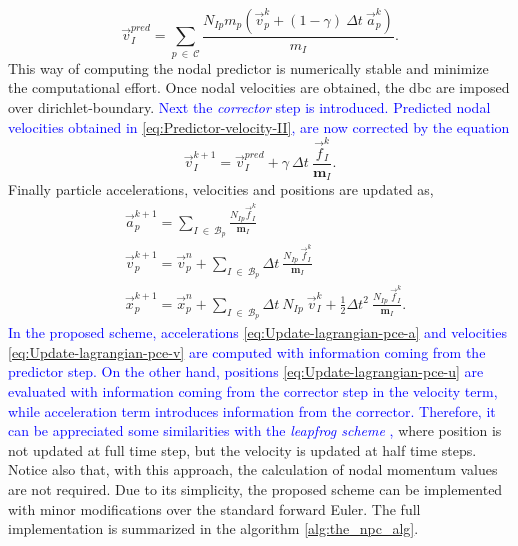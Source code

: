\documentclass[preprint,12pt,a4paper]{elsarticle}
\newcommand{\tens}[1]{
  \ensuremath{\mathbf{{#1}}}
}
\begin{document}
{\color{red}
\begin{equation}
  \label{eq:Predictor-velocity-II}
  \vec{v}_{I}^{pred} =  \sum_{p\ \in\ \mathcal{C}} \frac{ N_{Ip} m_p (\vec{v}_p^k + (1 - \gamma)\ \Delta t\ \vec{a}_p^k)}{m_I}.
\end{equation}
}
This way of computing the nodal predictor is numerically stable
and minimize the computational effort. Once nodal velocities are
obtained, the \acrshort{dbc} are imposed over \gls{dirichlet-boundary}. \textcolor{blue}{Next the \textit{corrector}  step is introduced. Predicted nodal velocities obtained in \eqref{eq:Predictor-velocity-II}, are now corrected by the equation}
\begin{equation}
  \label{eq:Corrector-velocity}
  \vec{v}_{I}^{k+1} = \vec{v}_{I}^{pred} + \gamma\ \Delta t\ \frac{\vec{f}_{I}^{k}}{\tens{m}_I}.
\end{equation}
Finally particle accelerations, velocities and positions are updated as,
\begin{align}
      \label{eq:Update-lagrangian-pce-a}    
        &\vec{a}_p^{k+1} = \sum_{I\ \in\ \mathcal{B}_p} \frac{N_{Ip}\vec{f}_{I}^{k}}{\tens{m}_I}\\
        \label{eq:Update-lagrangian-pce-v}  
      &\vec{v}_p^{k+1} = \vec{v}_p^n + \sum_{I\ \in\ \mathcal{B}_p} \Delta t\
        \frac{N_{Ip}\
        \vec{f}_{I}^{k}}{\tens{m}_I}\\
        \label{eq:Update-lagrangian-pce-u}
      &\vec{x}_p^{k+1} = \vec{x}_p^n + \sum_{I\ \in\ \mathcal{B}_p} \Delta t\
         N_{Ip}\ \vec{v}_{I}^{k} +
        \frac{1}{2}\Delta t^2\ \frac{N_{Ip}\
        \vec{f}_{I}^{k}}{\tens{m}_I}.
\end{align}
\textcolor{blue}{In the proposed scheme, accelerations \eqref{eq:Update-lagrangian-pce-a} and velocities \eqref{eq:Update-lagrangian-pce-v} are computed with information coming from the predictor step. On the other hand, positions \eqref{eq:Update-lagrangian-pce-u} are evaluated with information coming from the corrector step in the velocity term, while acceleration term introduces information from the corrector. Therefore, it can be appreciated some similarities with the \textit{leapfrog scheme} \cite{Zhang_book_2016},} where position is not updated at full time step, but the velocity is updated at half time steps. Notice also that, with this approach, the calculation of nodal momentum values are not required. Due to its simplicity, the proposed scheme can be implemented with minor modifications over the standard forward Euler. The full implementation is summarized in the algorithm \ref{alg:the_npc_alg}.
\end{document}
